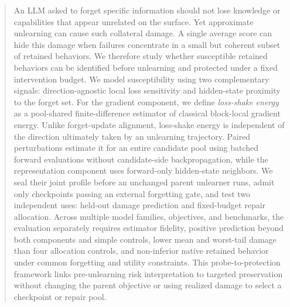 \begin{abstract}
An LLM asked to forget specific information should not lose knowledge or
capabilities that appear unrelated on the surface. Yet approximate
unlearning can cause such collateral damage. A single average score can
hide this damage when failures concentrate in a small but coherent subset
of retained behaviors. We therefore study whether susceptible retained
behaviors can be identified before unlearning and protected under a fixed
intervention budget. We model susceptibility using two complementary
signals: direction-agnostic local loss sensitivity and hidden-state
proximity to the forget set. For the gradient component, we define
\emph{loss-shake energy} as a pool-shared finite-difference estimator of
classical block-local gradient energy. Unlike
forget-update alignment, loss-shake energy is independent of the direction
ultimately taken by an unlearning trajectory. Paired perturbations estimate
it for an entire candidate pool using batched forward evaluations without
candidate-side backpropagation, while the representation component uses
forward-only hidden-state neighbors. We seal their joint profile before an
unchanged parent unlearner runs, admit only checkpoints passing an external
forgetting gate, and test two independent uses: held-out damage prediction and
fixed-budget repair allocation. Across multiple model families, objectives,
and benchmarks, the evaluation separately requires estimator fidelity,
positive prediction beyond both components and simple controls, lower mean
and worst-tail damage than four allocation controls, and non-inferior native
retained behavior under common forgetting and utility constraints. This
probe-to-protection framework links pre-unlearning risk interpretation to
targeted preservation without changing the parent objective or using realized
damage to select a checkpoint or repair pool.
\end{abstract}
